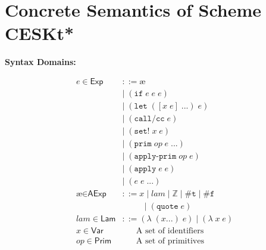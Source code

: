 \documentclass[12pt,draft]{article}
\newcommand\mae{\ensuremath{\text{\ae}}}
\newcommand{\lamsyn}[2]{(\lambda\;(#1 ...)\;#2)}
\newcommand{\vararglamsyn}[2]{(\lambda\;#1\;#2)}
\newcommand{\letsyn}[3]{(\texttt{let}\;([#1\;#2]\;...)\;#3)}
\newcommand{\ifsyn}[3]{(\texttt{if}\;#1\;#2\;#3)}
\newcommand{\primsyn}[2]{(\texttt{prim}\;#1\;#2\;...)}
\newcommand{\applyprimsyn}[2]{(\texttt{apply-prim}\;#1\;#2)}
\newcommand{\applysyn}[2]{(\texttt{apply}\;#1\;#2)}
\newcommand{\callccsyn}[1]{(\texttt{call/cc}\;#1)}
\newcommand{\setsyn}[2]{(\texttt{set!}\;#1\;#2)}
\newcommand{\quotesyn}[1]{(\texttt{quote}\;#1)}
\newcommand{\truesyn}{\texttt{\#t}}
\newcommand{\falsesyn}{\texttt{\#f}}
\begin{document}


\section{Concrete Semantics of Scheme CESKt*}

\small{
\begin{multicols*}{2}
\begin{center}
\textbf{Syntax Domains:}
\end{center}
\vspace{-18mm}
\begin{center}
\begin{align*}
e \in \textsf{Exp} &::= \mae \\
				&|\; \ifsyn{e}{e}{e} \\
				&|\; \letsyn{x}{e}{e} \\
				&|\; \callccsyn{e} \\
				&|\; \setsyn{x}{e} \\
				&|\; \primsyn{op}{e} \\
				&|\; \applyprimsyn{op}{e} \\
				&|\; \applysyn{e}{e} \\
				&|\; (e\;e\;...) \\
\mae \in \textsf{AExp} &::= x\;|\; lam\;|\; \mathbb{Z}
							\;|\; \truesyn \;|\; \falsesyn \\
				&\;\;\;\;\;\;\;\;\;\, |\; \quotesyn{e} \\
lam \in \textsf{Lam} &::= \lamsyn{x}{e} \;|\; \vararglamsyn{x}{e} \\
x \in \textsf{Var}   &\;\;\;\;\;\; \text{A set of identifiers} \\
op \in \textsf{Prim} &\;\;\;\;\;\; \text{A set of primitives}
\end{align*}

\end{center}
\end{multicols*}}
\end{document}
